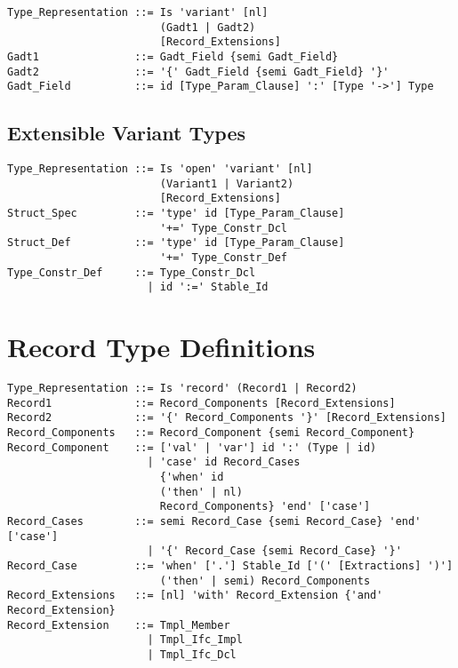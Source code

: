 \syntax\begin{lstlisting}
Type_Representation ::= Is 'variant' [nl]
                        (Gadt1 | Gadt2)
                        [Record_Extensions]
Gadt1               ::= Gadt_Field {semi Gadt_Field}
Gadt2               ::= '{' Gadt_Field {semi Gadt_Field} '}'
Gadt_Field          ::= id [Type_Param_Clause] ':' [Type '->'] Type
\end{lstlisting}





\subsection{Extensible Variant Types}
\label{sec:extensible-variant-types}

\syntax\begin{lstlisting}
Type_Representation ::= Is 'open' 'variant' [nl]
                        (Variant1 | Variant2)
                        [Record_Extensions]
Struct_Spec         ::= 'type' id [Type_Param_Clause] 
                        '+=' Type_Constr_Dcl
Struct_Def          ::= 'type' id [Type_Param_Clause] 
                        '+=' Type_Constr_Def
Type_Constr_Def     ::= Type_Constr_Dcl 
                      | id ':=' Stable_Id
\end{lstlisting}






\section{Record Type Definitions}
\label{sec:record-types}

\syntax\begin{lstlisting}
Type_Representation ::= Is 'record' (Record1 | Record2)
Record1             ::= Record_Components [Record_Extensions]
Record2             ::= '{' Record_Components '}' [Record_Extensions]
Record_Components   ::= Record_Component {semi Record_Component}
Record_Component    ::= ['val' | 'var'] id ':' (Type | id)
                      | 'case' id Record_Cases
                        {'when' id 
                        ('then' | nl) 
                        Record_Components} 'end' ['case']
Record_Cases        ::= semi Record_Case {semi Record_Case} 'end' ['case']
                      | '{' Record_Case {semi Record_Case} '}'
Record_Case         ::= 'when' ['.'] Stable_Id ['(' [Extractions] ')']
                        ('then' | semi) Record_Components
Record_Extensions   ::= [nl] 'with' Record_Extension {'and' Record_Extension}
Record_Extension    ::= Tmpl_Member
                      | Tmpl_Ifc_Impl
                      | Tmpl_Ifc_Dcl
\end{lstlisting}

